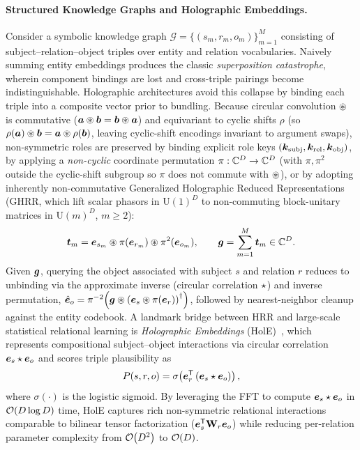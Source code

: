 \paragraph{Structured Knowledge Graphs and Holographic Embeddings.}
Consider a symbolic knowledge graph $\mathcal{G} = \{(s_m, r_m, o_m)\}_{m=1}^{M}$ consisting of subject--relation--object triples over entity and relation vocabularies.
Naively summing entity embeddings produces the classic \emph{superposition catastrophe}, wherein component bindings are lost and cross-triple pairings become indistinguishable.
Holographic architectures avoid this collapse by binding each triple into a composite vector prior to bundling.
Because circular convolution $\circledast$ is commutative ($\boldsymbol{a}\circledast\boldsymbol{b} = \boldsymbol{b}\circledast\boldsymbol{a}$) and equivariant to cyclic shifts $\rho$ (so $\rho(\boldsymbol{a})\circledast\boldsymbol{b} = \boldsymbol{a}\circledast\rho(\boldsymbol{b})$, leaving cyclic-shift encodings invariant to argument swaps), non-symmetric roles are preserved by binding explicit role keys $(\boldsymbol{k}_{\text{subj}}, \boldsymbol{k}_{\text{rel}}, \boldsymbol{k}_{\text{obj}})$, by applying a \emph{non-cyclic} coordinate permutation $\pi: \mathbb{C}^D \to \mathbb{C}^D$ (with $\pi, \pi^2$ outside the cyclic-shift subgroup so $\pi$ does not commute with $\circledast$), or by adopting inherently non-commutative Generalized Holographic Reduced Representations (GHRR, which lift scalar phasors in $\mathrm{U}(1)^D$ to non-commuting block-unitary matrices in $\mathrm{U}(m)^D$, $m \ge 2$):
\begin{equation}\label{eq:kg_holographic_trace}
    \boldsymbol{t}_m = \boldsymbol{e}_{s_m} \circledast \pi(\boldsymbol{e}_{r_m}) \circledast \pi^2(\boldsymbol{e}_{o_m}),
    \qquad
    \boldsymbol{g} = \sum_{m=1}^{M} \boldsymbol{t}_m \in \mathbb{C}^D.
\end{equation}
Given $\boldsymbol{g}$, querying the object associated with subject $s$ and relation $r$ reduces to unbinding via the approximate inverse (circular correlation $\star$) and inverse permutation, $\hat{\boldsymbol{e}}_o = \pi^{-2}\!\left(\boldsymbol{g} \circledast {(\boldsymbol{e}_s \circledast\pi(\boldsymbol{e}_r))}^{\dagger}\right)$, followed by nearest-neighbor cleanup against the entity codebook.
A landmark bridge between HRR and large-scale statistical relational learning is \emph{Holographic Embeddings} (HolE)~\cite{NICKEL_2016_HOLE}, which represents compositional subject--object interactions via circular correlation $\boldsymbol{e}_s \star \boldsymbol{e}_o$ and scores triple plausibility as
\begin{equation}\label{eq:hole_score}
    P(s, r, o) = \sigma\!\left(\boldsymbol{e}_r^{\mathsf{T}} \left(\boldsymbol{e}_s \star \boldsymbol{e}_o\right)\right),
\end{equation}
where $\sigma(\cdot)$ is the logistic sigmoid.
By leveraging the FFT to compute $\boldsymbol{e}_s \star \boldsymbol{e}_o$ in $\mathcal{O}\!\left(D \log D\right)$ time, HolE captures rich non-symmetric relational interactions comparable to bilinear tensor factorization ($\boldsymbol{e}_s^{\mathsf{T}} \mathbf{W}_r \boldsymbol{e}_o$) while reducing per-relation parameter complexity from $\mathcal{O}\!\left(D^2\right)$ to $\mathcal{O}\!\left(D\right)$.

